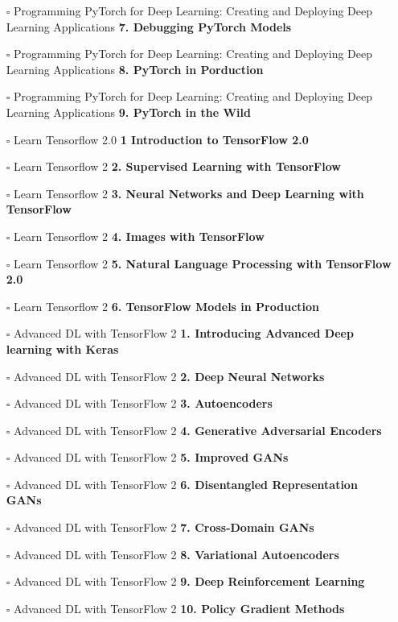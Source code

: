 \documentclass[a4, landscape, 12pt]{article}
\newcommand{\checkbox}{$\square$}%
\begin{document}
\begin{itemize}
{}
\item [\checkbox]  Programming PyTorch for Deep Learning: Creating and Deploying Deep Learning Applications \textbf{ 7. Debugging PyTorch Models
}
\item [\checkbox]  Programming PyTorch for Deep Learning: Creating and Deploying Deep Learning Applications \textbf{ 8. PyTorch in Porduction
}
\item [\checkbox]  Programming PyTorch for Deep Learning: Creating and Deploying Deep Learning Applications \textbf{ 9. PyTorch in the Wild
}
\item [\checkbox]  Learn Tensorflow 2.0 \textbf{ 1 Introduction to TensorFlow 2.0
}
\item [\checkbox]  Learn Tensorflow 2 \textbf{ 2. Supervised Learning with TensorFlow
}
\item [\checkbox]  Learn Tensorflow 2 \textbf{ 3. Neural Networks and Deep Learning with TensorFlow
}
\item [\checkbox]  Learn Tensorflow 2 \textbf{ 4. Images with TensorFlow
}
\item [\checkbox]  Learn Tensorflow 2 \textbf{ 5. Natural Language Processing with TensorFlow 2.0
}
\item [\checkbox]  Learn Tensorflow 2 \textbf{ 6. TensorFlow Models in Production
}
\item [\checkbox]  Advanced DL with TensorFlow 2 \textbf{ 1. Introducing Advanced Deep learning with Keras
}
\item [\checkbox]  Advanced DL with TensorFlow 2 \textbf{ 2. Deep Neural Networks
}
\item [\checkbox]  Advanced DL with TensorFlow 2 \textbf{ 3. Autoencoders
}
\item [\checkbox]  Advanced DL with TensorFlow 2 \textbf{ 4. Generative Adversarial Encoders
}
\item [\checkbox]  Advanced DL with TensorFlow 2 \textbf{ 5. Improved GANs
}
\item [\checkbox]  Advanced DL with TensorFlow 2 \textbf{ 6. Disentangled Representation GANs
}
\item [\checkbox]  Advanced DL with TensorFlow 2 \textbf{ 7. Cross-Domain GANs
}
\item [\checkbox]  Advanced DL with TensorFlow 2 \textbf{ 8. Variational Autoencoders
}
\item [\checkbox]  Advanced DL with TensorFlow 2 \textbf{ 9. Deep Reinforcement Learning
}
\item [\checkbox]  Advanced DL with TensorFlow 2 \textbf{ 10. Policy Gradient Methods
}
\end{itemize}
\end{document}
